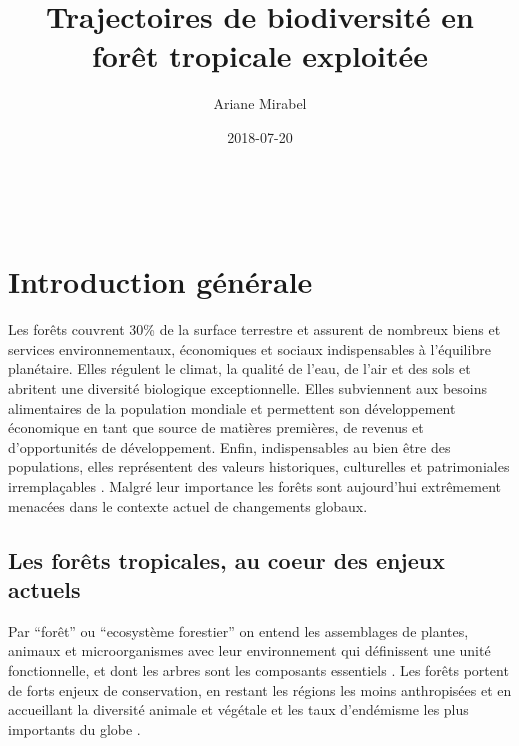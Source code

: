 \documentclass[
  11pt,
  french,
  A4paper,
  extrafontsizes,onecolumn,openright
  ]{memoir}
\title{Trajectoires de biodiversité en forêt tropicale exploitée}
\author{Ariane Mirabel}
\date{2018-07-20}
\begin{document}
\frontmatter



\makeflyleaf
\newpage
~
\newpage









\LargeMargins
{
\hypersetup{linkcolor=}
\setcounter{tocdepth}{3}
\tableofcontents
}



\LargeMargins
\mainmatter

\chapter{Introduction générale}\label{introduction-generale}

Les forêts couvrent 30\% de la surface terrestre et assurent de nombreux
biens et services environnementaux, économiques et sociaux
indispensables à l'équilibre planétaire. Elles régulent le climat, la
qualité de l'eau, de l'air et des sols et abritent une diversité
biologique exceptionnelle. Elles subviennent aux besoins alimentaires de
la population mondiale et permettent son développement économique en
tant que source de matières premières, de revenus et d'opportunités de
développement. Enfin, indispensables au bien être des populations, elles
représentent des valeurs historiques, culturelles et patrimoniales
irremplaçables \autocites{FRA2015}{Tilman2014}. Malgré leur importance
les forêts sont aujourd'hui extrêmement menacées dans le contexte actuel
de changements globaux.

\section{Les forêts tropicales, au coeur des enjeux
actuels}\label{les-forets-tropicales-au-coeur-des-enjeux-actuels}

Par ``forêt'' ou ``ecosystème forestier'' on entend les assemblages de
plantes, animaux et microorganismes avec leur environnement qui
définissent une unité fonctionnelle, et dont les arbres sont les
composants essentiels \autocite{FRA2000}. Les forêts portent de forts
enjeux de conservation, en restant les régions les moins anthropisées et
en accueillant la diversité animale et végétale et les taux d'endémisme
les plus importants du globe \autocites{Myers2000}{Mittermeier2003}.
\end{document}
